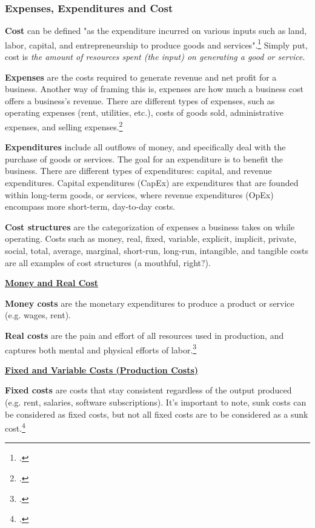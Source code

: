 \subsubsection{Expenses, Expenditures and Cost}

\textbf{Cost} can be defined "as the expenditure incurred on various inputs such as land, labor, capital, and entrepreneurship to produce goods and services".\footcite{kin2025cost} Simply put, cost is \textit{the amount of resources spent (the input) on generating a good or service}.

\textbf{Expenses} are the costs required to generate revenue and net profit for a business. Another way of framing this is, expenses are how much a business cost offers a business's revenue. There are different types of expenses, such as operating expenses (rent, utilities, etc.), costs of goods sold, administrative expenses, and selling expenses.\footcite{thomas_2026_expense}

\textbf{Expenditures} include all outflows of money, and specifically deal with the purchase of goods or services. The goal for an expenditure is to benefit the business. There are different types of expenditures: capital, and revenue expenditures. Capital expenditures (CapEx) are expenditures that are founded within long-term goods, or services, where revenue expenditures (OpEx) encompass more short-term, day-to-day costs.

\textbf{Cost structures} are the categorization of expenses a business takes on while operating. Costs such as money, real, fixed, variable, explicit, implicit, private, social, total, average, marginal, short-run, long-run, intangible, and tangible costs are all examples of cost structures (a mouthful, right?).



\underline{\textbf{Money and Real Cost}}

\textbf{Money costs} are the monetary expenditures to produce a product or service (e.g. wages, rent).

\textbf{Real costs} are the pain and effort of all resources used in production, and captures both mental and physical efforts of labor.\footcite{kin2025cost}



\underline{\textbf{Fixed and Variable Costs (Production Costs)}}

\textbf{Fixed costs} are costs that stay consistent regardless of the output produced (e.g. rent, salaries, software subscriptions). It's important to note, sunk costs can be considered as fixed costs, but not all fixed costs are to be considered as a sunk cost.\footcite{nickolas_2025_variable}

